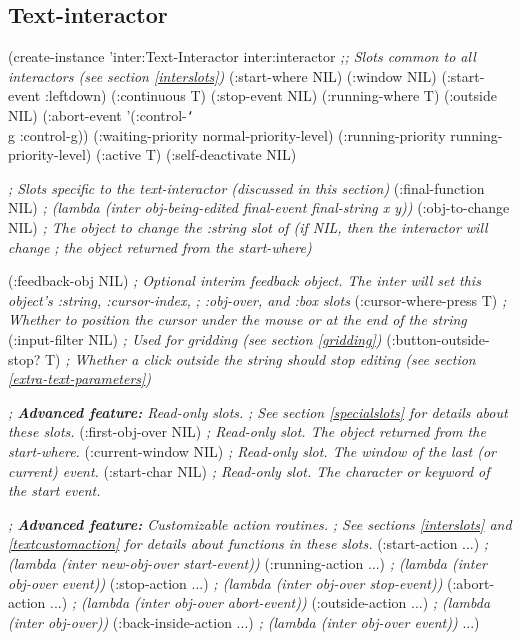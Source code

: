 \begin{group}
\section{Text-interactor}

\begin{programexample}
(create-instance 'inter:Text-Interactor inter:interactor
  {\it ;; Slots common to all interactors (see section \ref{interslots})}
  (:start-where NIL)
  (:window NIL)
  (:start-event :leftdown)
  (:continuous T)
  (:stop-event NIL)
  (:running-where T)
  (:outside NIL)
  (:abort-event '(:control-{\tt\char`\\}g :control-g))
  (:waiting-priority normal-priority-level)
  (:running-priority running-priority-level)
  (:active T)
  (:self-deactivate NIL)

  {\it ; Slots specific to the text-interactor (discussed in this section)}
  (:final-function NIL)      {\it ; (lambda (inter obj-being-edited final-event final-string x y))}
  (:obj-to-change NIL)       {\it ; The object to change the :string slot of (if NIL, then the interactor will change}
                             {\it ; the object returned from the start-where)}

  (:feedback-obj NIL)        {\it ; Optional interim feedback object.  The inter will set this object's :string, :cursor-index,}
                             {\it ; :obj-over, and :box slots}
  (:cursor-where-press T)    {\it ; Whether to position the cursor under the mouse or at the end of the string}
  (:input-filter NIL)        {\it ; Used for gridding (see section \ref{gridding})}
  (:button-outside-stop? T)  {\it ; Whether a click outside the string should stop editing (see section \ref{extra-text-parameters})}

  {\it ; {\bf Advanced feature:}  Read-only slots.}
  {\it ; See section \ref{specialslots} for details about these slots.}
  (:first-obj-over NIL)     {\it ; Read-only slot.  The object returned from the start-where.}
  (:current-window NIL)     {\it ; Read-only slot.  The window of the last (or current) event.}
  (:start-char NIL)         {\it ; Read-only slot.  The character or keyword of the start event.}

  {\it ; {\bf Advanced feature:} Customizable action routines.}
  {\it ; See sections \ref{interslots} and \ref{textcustomaction} for details about functions in these slots.}
  (:start-action ...)       {\it ; (lambda (inter new-obj-over start-event))}
  (:running-action ...)     {\it ; (lambda (inter obj-over event))}
  (:stop-action ...)        {\it ; (lambda (inter obj-over stop-event))}
  (:abort-action ...)       {\it ; (lambda (inter obj-over abort-event))}
  (:outside-action ...)     {\it ; (lambda (inter obj-over))}
  (:back-inside-action ...) {\it ; (lambda (inter obj-over event))}
...)
\end{programexample}
\end{group}


